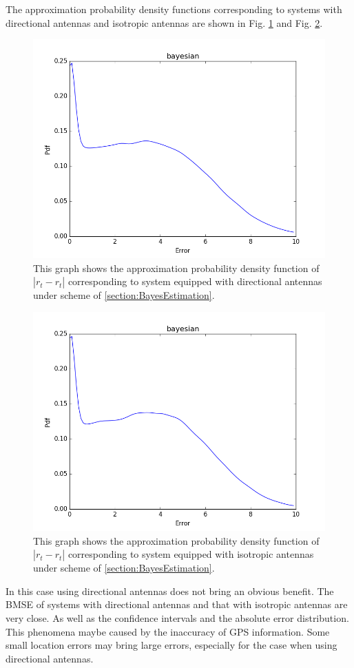 The approximation probability density functions corresponding to systems with directional antennas and isotropic antennas are shown in Fig. \ref{figure: bayesdirex} and Fig. \ref{figure: bayesomniex}.
\begin{figure}[]
	\centering
	\includegraphics[scale=0.5]{Figures/bayesdirex.png}
	\caption{This graph shows the approximation probability density function of $|r_{t}-\hat{r_{t}}|$ corresponding to system equipped with directional antennas under scheme of \ref{section:BayesEstimation}. }
	\label{figure: bayesdirex}
\end{figure}
\begin{figure}[]
	\centering
	\includegraphics[scale=0.5]{Figures/bayesomniex.png}
	\caption{This graph shows the approximation probability density function of $|r_{t}-\hat{r_{t}}|$ corresponding to system equipped with isotropic antennas under scheme of \ref{section:BayesEstimation}. }
	\label{figure: bayesomniex}
\end{figure}
In this case using directional antennas does not bring an obvious benefit. The BMSE of systems with directional antennas and that with isotropic antennas are very close. As well as the confidence intervals and the absolute error distribution. This phenomena maybe caused by the inaccuracy of GPS information. Some small location errors may bring large errors, especially for the case when using directional antennas. 
